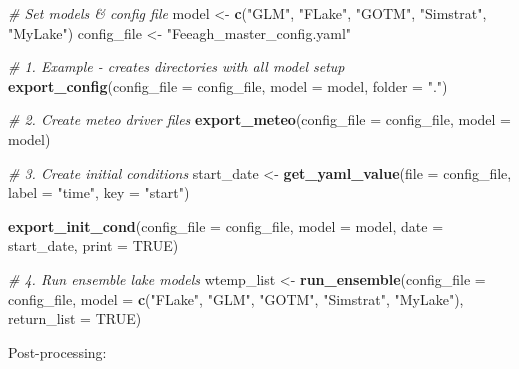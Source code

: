 \documentclass[
]{article}
\newenvironment{Shaded}{\begin{snugshade}}{\end{snugshade}}
\newcommand{\CommentTok}[1]{\textcolor[rgb]{0.56,0.35,0.01}{\textit{#1}}}
\newcommand{\DataTypeTok}[1]{\textcolor[rgb]{0.13,0.29,0.53}{#1}}
\newcommand{\KeywordTok}[1]{\textcolor[rgb]{0.13,0.29,0.53}{\textbf{#1}}}
\newcommand{\NormalTok}[1]{#1}
\newcommand{\OtherTok}[1]{\textcolor[rgb]{0.56,0.35,0.01}{#1}}
\newcommand{\StringTok}[1]{\textcolor[rgb]{0.31,0.60,0.02}{#1}}
\begin{document}
\begin{Shaded}
\begin{Highlighting}[]
\CommentTok{# Set models & config file}
\NormalTok{model <-}\StringTok{ }\KeywordTok{c}\NormalTok{(}\StringTok{"GLM"}\NormalTok{,  }\StringTok{"FLake"}\NormalTok{, }\StringTok{"GOTM"}\NormalTok{, }\StringTok{"Simstrat"}\NormalTok{, }\StringTok{"MyLake"}\NormalTok{)}
\NormalTok{config_file <-}\StringTok{ "Feeagh_master_config.yaml"}

\CommentTok{# 1. Example - creates directories with all model setup}
\KeywordTok{export_config}\NormalTok{(}\DataTypeTok{config_file =}\NormalTok{ config_file, }\DataTypeTok{model =}\NormalTok{ model, }\DataTypeTok{folder =} \StringTok{"."}\NormalTok{)}

\CommentTok{# 2. Create meteo driver files}
\KeywordTok{export_meteo}\NormalTok{(}\DataTypeTok{config_file =}\NormalTok{ config_file, }\DataTypeTok{model =}\NormalTok{ model)}

\CommentTok{# 3. Create initial conditions}
\NormalTok{start_date <-}\StringTok{ }\KeywordTok{get_yaml_value}\NormalTok{(}\DataTypeTok{file =}\NormalTok{ config_file, }\DataTypeTok{label =}  \StringTok{"time"}\NormalTok{, }\DataTypeTok{key =} \StringTok{"start"}\NormalTok{)}

\KeywordTok{export_init_cond}\NormalTok{(}\DataTypeTok{config_file =}\NormalTok{ config_file, }
                 \DataTypeTok{model =}\NormalTok{ model,}
                 \DataTypeTok{date =}\NormalTok{ start_date,}
                 \DataTypeTok{print =} \OtherTok{TRUE}\NormalTok{)}

\CommentTok{# 4. Run ensemble lake models}
\NormalTok{wtemp_list <-}\StringTok{ }\KeywordTok{run_ensemble}\NormalTok{(}\DataTypeTok{config_file =}\NormalTok{ config_file,}
                           \DataTypeTok{model =} \KeywordTok{c}\NormalTok{(}\StringTok{"FLake"}\NormalTok{, }\StringTok{"GLM"}\NormalTok{, }\StringTok{"GOTM"}\NormalTok{, }\StringTok{"Simstrat"}\NormalTok{, }\StringTok{"MyLake"}\NormalTok{),}
                           \DataTypeTok{return_list =} \OtherTok{TRUE}\NormalTok{)}
\end{Highlighting}
\end{Shaded}

Post-processing:
\end{document}
